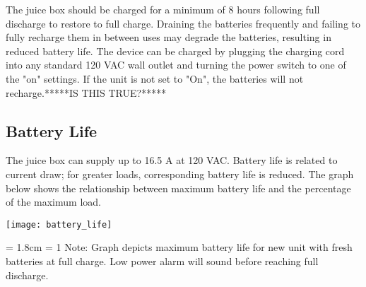 \documentclass[../jb_user_manual.tex]{subfiles}
\begin{document}
The juice box should be charged for a minimum of 8 hours following full discharge to restore to full charge.  Draining the batteries frequently and failing to fully recharge them in between uses may degrade the batteries, resulting in reduced battery life.  The device can be charged by plugging the charging cord into any standard 120 VAC wall outlet and turning the power switch to one of the "on" settings. If the unit is not set to "On", the batteries will not recharge.*****IS THIS TRUE?*****

\subsection{\Large{Battery Life}}

The juice box can supply up to 16.5 A at 120 VAC.  Battery life is related to current draw; for greater loads, corresponding battery life is reduced.  The graph below shows the relationship between maximum battery life and the percentage of the maximum load.

\vspace{3mm}
\texttt{[image: battery\_life]}
\vspace{3mm}

\hangindent = 1.8cm
\hangafter = 1
Note: Graph depicts maximum battery life for new unit with fresh batteries at full charge.  Low power alarm will sound before reaching full discharge.
\end{document}
